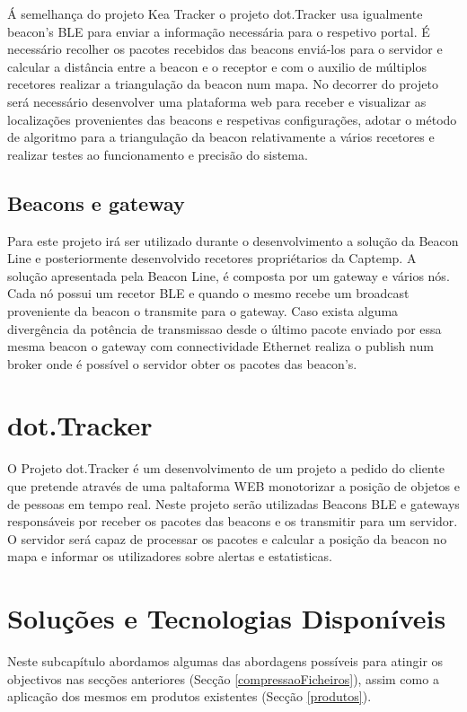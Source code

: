 Á semelhança do projeto Kea Tracker o projeto dot.Tracker usa igualmente beacon's BLE para enviar a informação necessária para o respetivo portal. É necessário recolher os pacotes recebidos das beacons enviá-los para o servidor e calcular a distância entre a beacon e o receptor e com o auxilio de múltiplos recetores realizar a triangulação da beacon num mapa. No decorrer do projeto será necessário desenvolver uma plataforma web para receber e visualizar as localizações provenientes das beacons e respetivas configurações, adotar o método de algoritmo para a triangulação da beacon relativamente a vários recetores e realizar testes ao funcionamento e precisão do sistema.
\subsection{Beacons e gateway}
 Para este projeto irá ser utilizado durante o desenvolvimento a solução da Beacon Line\cite{taskit} e posteriormente desenvolvido recetores propriétarios da Captemp. A solução apresentada pela Beacon Line, é composta por um gateway e vários nós. Cada nó possui um recetor BLE e quando o mesmo recebe um broadcast proveniente da beacon o transmite para o gateway. Caso exista alguma divergência da potência de transmissao desde o último pacote enviado por essa mesma beacon o gateway com connectividade Ethernet realiza o publish num broker onde é possível o servidor obter os pacotes das beacon's.

\section{dot.Tracker} \label{dot.tracker}
\par O Projeto dot.Tracker é um desenvolvimento de um projeto a pedido do cliente que pretende através de uma paltaforma WEB monotorizar a posição de objetos e de pessoas em tempo real. Neste projeto serão utilizadas Beacons BLE e gateways responsáveis por receber os pacotes das beacons e os transmitir para um servidor. O servidor será capaz de processar os pacotes e calcular a posição da beacon no mapa e informar os utilizadores sobre alertas e estatisticas.

\section{Soluções e Tecnologias Disponíveis} \label{solucoesDisponiveis}

Neste subcapítulo abordamos algumas das abordagens possíveis para atingir os objectivos nas secções anteriores (Secção \ref{compressaoFicheiros}), assim como a aplicação dos mesmos em produtos existentes (Secção \ref{produtos}).



